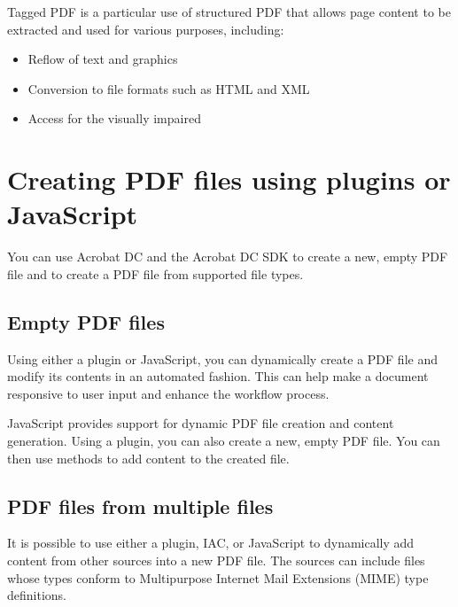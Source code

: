 \documentclass[letterpaper,12pt,english,openany,oneside]{sphinxmanual}
\begin{document}
Tagged PDF is a particular use of structured PDF that allows page content to be extracted and used for various purposes, including:
\begin{itemize}
\item {} 
Reflow of text and graphics

\item {} 
Conversion to file formats such as HTML and XML

\item {} 
Access for the visually impaired

\end{itemize}




\section{Creating PDF files using plug\sphinxhyphen{}ins or JavaScript}
\label{\detokenize{Overview_PDFCreation:creating-pdf-files-using-plug-ins-or-javascript}}
You can use Acrobat DC and the Acrobat DC SDK to create a new, empty PDF file and to create a PDF file from supported file types.




\subsection{Empty PDF files}
\label{\detokenize{Overview_PDFCreation:empty-pdf-files}}
Using either a plug\sphinxhyphen{}in or JavaScript, you can dynamically create a PDF file and modify its contents in an automated fashion. This can help make a document responsive to user input and enhance the workflow process.

JavaScript provides support for dynamic PDF file creation and content generation. Using a plug\sphinxhyphen{}in, you can also create a new, empty PDF file. You can then use methods to add content to the created file.




\subsection{PDF files from multiple files}
\label{\detokenize{Overview_PDFCreation:pdf-files-from-multiple-files}}
It is possible to use either a plug\sphinxhyphen{}in, IAC, or JavaScript to dynamically add content from other sources into a new PDF file. The sources can include files whose types conform to Multipurpose Internet Mail Extensions (MIME) type definitions.
\end{document}
